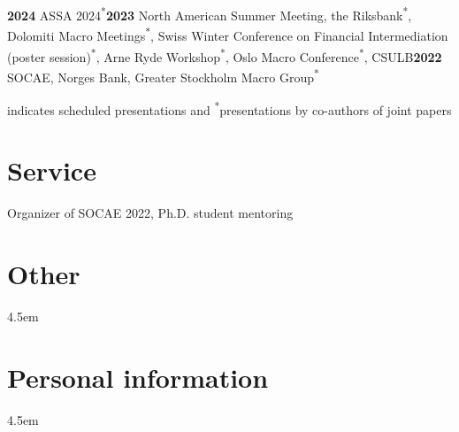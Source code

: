 \documentclass{clean_cv}
\newcommand{\datetabspace}{4.5em}
\begin{document}
\newcommand{\schmark}[0]{\textsuperscript{\dag}}
\newcommand{\comark}[0]{\textsuperscript{*}}

\textbf{2024} ASSA 2024\comark\schmark \quad \textbf{2023} North American Summer Meeting, the Riksbank\comark, Dolomiti Macro Meetings\comark, Swiss Winter Conference on Financial Intermediation (poster session)\comark, Arne Ryde Workshop\comark, Oslo Macro Conference\comark, CSULB\schmark \quad \textbf{2022} SOCAE, Norges Bank, Greater Stockholm Macro Group\comark

\smallskip

\schmark indicates scheduled presentations and \comark presentations by co-authors of joint papers

\section{Service}
Organizer of SOCAE 2022, Ph.D. student mentoring

\section{Other}
\begin{datetabular}{\datetabspace}
\end{datetabular}

\section{Personal information}

\begin{datetabular}{\datetabspace}
\end{datetabular}
\end{document}

